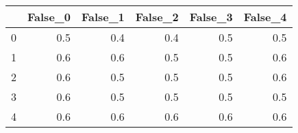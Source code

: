 \begin{tabular}{lrrrrr}
\toprule
{} &  False\_0 &  False\_1 &  False\_2 &  False\_3 &  False\_4 \\ \hline
\midrule
0 &      0.5 &      0.4 &      0.4 &      0.5 &      0.5 \\ \hline
1 &      0.6 &      0.6 &      0.5 &      0.5 &      0.6 \\ \hline
2 &      0.6 &      0.5 &      0.5 &      0.5 &      0.6 \\ \hline
3 &      0.6 &      0.5 &      0.5 &      0.5 &      0.5 \\ \hline
4 &      0.6 &      0.6 &      0.6 &      0.6 &      0.6 \\ \hline
\bottomrule
\end{tabular}
